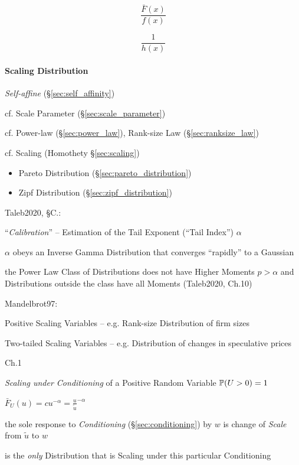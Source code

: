 \[
  \frac{\bar{F}(x)}{f(x)}
\]

\[
  \frac{1}{h(x)}
\]



\paragraph{Scaling Distribution}\label{sec:scaling_distribution}\hfill

\emph{Self-affine} (\S\ref{sec:self_affinity})

cf. Scale Parameter (\S\ref{sec:scale_parameter})

cf. Power-law (\S\ref{sec:power_law}), Rank-size Law (\S\ref{sec:ranksize_law})

cf. Scaling (Homothety \S\ref{sec:scaling})


\begin{itemize}
  \item Pareto Distribution (\S\ref{sec:pareto_distribution})
  \item Zipf Distribution (\S\ref{sec:zipf_distribution})
\end{itemize}

Taleb2020, \S C.:

``\emph{Calibration}'' -- Estimation of the Tail Exponent (``Tail Index'')
$\alpha$

$\alpha$ obeys an Inverse Gamma Distribution that converges ``rapidly'' to a
Gaussian

the Power Law Class of Distributions does not have Higher Moments $p > \alpha$
and Distributions outside the class have all Moments (Taleb2020, Ch.10)

Mandelbrot97:

Positive Scaling Variables -- e.g. Rank-size Distribution of firm sizes

Two-tailed Scaling Variables -- e.g. Distribution of changes in speculative
prices

Ch.1

\emph{Scaling under Conditioning} of a Positive Random Variable
$\mathbb{P}(U > 0) = 1$

$\bar{F}_U(u) = c u^{-\alpha} = \frac{u}{\tilde{u}}^{-\alpha}$

the sole response to \emph{Conditioning} (\S\ref{sec:conditioning}) by $w$ is
change of \emph{Scale} from $\tilde{u}$ to $w$

is the \emph{only} Distribution that is Scaling under this particular
Conditioning

